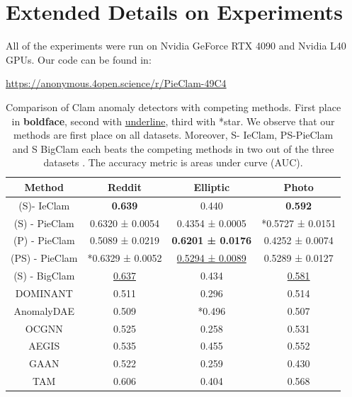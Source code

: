 \documentclass[letterpaper]{article} %
\begin{document}
\section{Extended Details on Experiments}
\label{Extended Details on Experiments}

All of the experiments were run on Nvidia GeForce RTX 4090 and Nvidia L40 GPUs.
Our code can be found in: 

\url{https://anonymous.4open.science/r/PieClam-49C4} 


\begin{table}[t]
\centering
\begin{tabular}{|c|c|c|c|}
    \hline
  Method  & Reddit& Elliptic& Photo\\
    \hline

 (S)- IeClam& \textbf{0.639}& 0.440&\textbf{0.592}\\
 (S) - PieClam& 0.6320 ± 0.0054&  
0.4354 ± 0.0005&*0.5727 ± 0.0151\\
 (P) - PieClam& 0.5089 ± 0.0219& \textbf{0.6201 ± 0.0176}&0.4252 ± 0.0074\\
 (PS) - PieClam& *0.6329 ± 0.0052& \underline{0.5294 ± 0.0089}&0.5289 ± 0.0127\\
 (S) - BigClam & \underline{0.637}& 0.434&\underline{0.581}\\
 \hline
 DOMINANT  & 0.511& 0.296&0.514\\
 AnomalyDAE &0.509& *0.496&0.507\\
 OCGNN  &0.525 & 0.258&0.531\\
 AEGIS &0.535 & 0.455&0.552\\
 GAAN &0.522 &0.259 &0.430\\
 TAM &0.606 & 0.404 & 0.568\\
 \hline
\end{tabular}
\caption{Comparison of Clam anomaly detectors with competing methods. %
 First place in \textbf{boldface}, second with \underline{underline}, third with *star. We observe that our methods are first place on all datasets. Moreover, S- IeClam, PS-PieClam and S BigClam each beats the competing methods in two out of the three datasets . The accuracy metric is areas under curve (AUC).}
\label{Table2}
\end{table}
\end{document}
